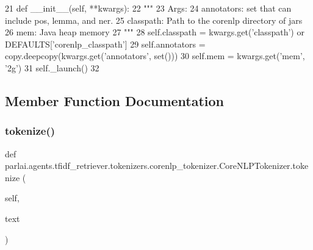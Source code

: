 \begin{DoxyCode}
21     \textcolor{keyword}{def }\_\_init\_\_(self, **kwargs):
22         \textcolor{stringliteral}{"""}
23 \textcolor{stringliteral}{        Args:}
24 \textcolor{stringliteral}{            annotators: set that can include pos, lemma, and ner.}
25 \textcolor{stringliteral}{            classpath: Path to the corenlp directory of jars}
26 \textcolor{stringliteral}{            mem: Java heap memory}
27 \textcolor{stringliteral}{        """}
28         self.classpath = kwargs.get(\textcolor{stringliteral}{'classpath'}) \textcolor{keywordflow}{or} DEFAULTS[\textcolor{stringliteral}{'corenlp\_classpath'}]
29         self.annotators = copy.deepcopy(kwargs.get(\textcolor{stringliteral}{'annotators'}, set()))
30         self.mem = kwargs.get(\textcolor{stringliteral}{'mem'}, \textcolor{stringliteral}{'2g'})
31         self.\_launch()
32 
\end{DoxyCode}


\subsection{Member Function Documentation}
\mbox{\label{classparlai_1_1agents_1_1tfidf__retriever_1_1tokenizers_1_1corenlp__tokenizer_1_1CoreNLPTokenizer_af7fb8c70ddbd8c11e3e32365af30e567}} 
\subsubsection{\texorpdfstring{tokenize()}{tokenize()}}
{\footnotesize\ttfamily def parlai.\+agents.\+tfidf\+\_\+retriever.\+tokenizers.\+corenlp\+\_\+tokenizer.\+Core\+N\+L\+P\+Tokenizer.\+tokenize (\begin{DoxyParamCaption}\item[{}]{self,  }\item[{}]{text }\end{DoxyParamCaption})}




